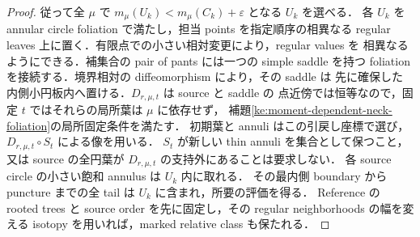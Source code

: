 \begin{proof}
従って全 $\mu$ で $m_\mu(U_k)<m_\mu(C_k)+\varepsilon$ となる $U_k$ を選べる．
各 $U_k$ を annular circle foliation で満たし，担当 points を指定順序の相異なる
regular leaves 上に置く．有限点での小さい相対変更により，regular values を
相異なるようにできる．補集合の pair of pants には一つの simple saddle を持つ
foliation を接続する．境界相対の diffeomorphism により，その saddle は
先に確保した内側小円板内へ置ける．$D_{r,\mu,t}$ は source と saddle の
点近傍では恒等なので，固定 $t$ ではそれらの局所葉は $\mu$ に依存せず，
補題\ref{ke:moment-dependent-neck-foliation}の局所固定条件を満たす．
初期葉と annuli はこの引戻し座標で選び，$D_{r,\mu,t}\circ S_t$ による像を用いる．
$S_t$ が新しい thin annuli を集合として保つこと，又は source の全円葉が
$D_{r,\mu,t}$ の支持外にあることは要求しない．
各 source circle の小さい飽和 annulus は $U_k$ 内に取れる．
その最内側 boundary から puncture までの全 tail は $U_k$ に含まれ，所要の評価を得る．
Reference の rooted trees と source order を先に固定し，その regular neighborhoods
の幅を変える isotopy を用いれば，marked relative class も保たれる．
\end{proof}

